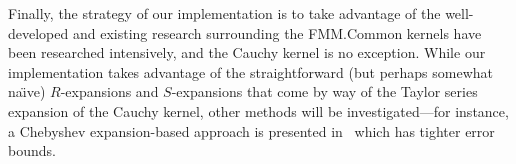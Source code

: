 Finally, the strategy of our implementation is to take advantage of
the well-developed and existing research surrounding the FMM.\@ Common
kernels have been researched intensively, and the Cauchy kernel is no
exception. While our implementation takes advantage of the
straightforward (but perhaps somewhat na\"{\i}ve) $R$-expansions and
$S$-expansions that come by way of the Taylor series expansion of the
Cauchy kernel, other methods will be investigated---for instance, a
Chebyshev expansion-based approach is presented in~\cite{dutt1996fast}
which has tighter error bounds.



